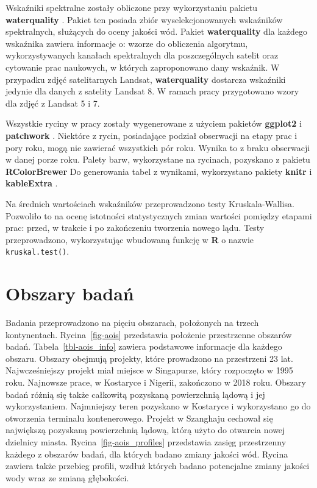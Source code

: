\documentclass{amuthesis}
\begin{document}
Wskaźniki spektralne zostały obliczone przy wykorzystaniu pakietu
\textbf{waterquality} \autocite{R-waterquality}. Pakiet ten posiada
zbiór wyselekcjonowanych wskaźników spektralnych, służących do oceny
jakości wód. Pakiet \textbf{waterquality} dla każdego wskaźnika zawiera
informacje o: wzorze do obliczenia algorytmu, wykorzystywanych kanałach
spektralnych dla poszczególnych satelit oraz cytowanie prac naukowych, w
których zaproponowano dany wskaźnik. W przypadku zdjęć satelitarnych
Landsat, \textbf{waterquality} dostarcza wskaźniki jedynie dla danych z
satelity Landsat 8. W ramach pracy przygotowano wzory dla zdjęć z
Landsat 5 i 7.

Wszystkie ryciny w pracy zostały wygenerowane z użyciem pakietów
\textbf{ggplot2} \autocite{R-ggplot2} i \textbf{patchwork}
\autocite{R-patchwork}. Niektóre z rycin, posiadające podział obserwacji
na etapy prac i pory roku, mogą nie zawierać wszystkich pór roku. Wynika
to z braku obserwacji w danej porze roku. Palety barw, wykorzystane na
rycinach, pozyskano z pakietu \textbf{RColorBrewer}
\autocite{R-RColorBrewer} Do generowania tabel z wynikami, wykorzystano
pakiety \textbf{knitr} \autocite{R-knitr} i \textbf{kableExtra}
\autocite{R-kableExtra}.

Na średnich wartościach wskaźników przeprowadzono testy
Kruskala-Wallisa. Pozwoliło to na ocenę istotności statystycznych zmian
wartości pomiędzy etapami prac: przed, w trakcie i po zakończeniu
tworzenia nowego lądu. Testy przeprowadzono, wykorzystując wbudowaną
funkcję w \textbf{R} o nazwie \texttt{kruskal.test()}.


\hypertarget{sec-obszary_badan}{%
\chapter{Obszary badań}\label{sec-obszary_badan}}

Badania przeprowadzono na pięciu obszarach, położonych na trzech
kontynentach. Rycina~\ref{fig-aois} przedstawia położenie przestrzenne
obszarów badań. Tabela~\ref{tbl-aois_info} zawiera podstawowe informacje
dla każdego obszaru. Obszary obejmują projekty, które prowadzono na
przestrzeni 23 lat. Najwcześniejszy projekt miał miejsce w Singapurze,
który rozpoczęto w 1995 roku. Najnowsze prace, w Kostaryce i Nigerii,
zakończono w 2018 roku. Obszary badań różnią się także całkowitą
pozyskaną powierzchnią lądową i jej wykorzystaniem. Najmniejszy teren
pozyskano w Kostaryce i wykorzystano go do otworzenia terminalu
kontenerowego. Projekt w Szanghaju cechował się największą pozyskaną
powierzchnią lądową, którą użyto do otwarcia nowej dzielnicy miasta.
Rycina~\ref{fig-aois_profiles} przedstawia zasięg przestrzenny każdego z
obszarów badań, dla których badano zmiany jakości wód. Rycina zawiera
także przebieg profili, wzdłuż których badano potencjalne zmiany jakości
wody wraz ze zmianą głębokości.
\end{document}
